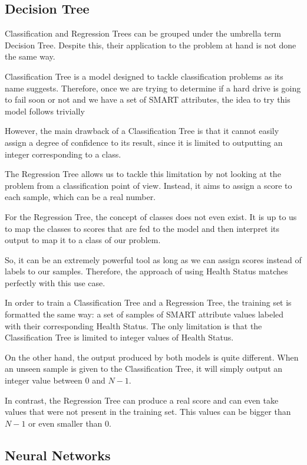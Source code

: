 \subsection{Decision Tree}\label{subsec:decision_tree}

Classification and Regression Trees can be grouped under the umbrella term Decision Tree.
Despite this, their application to the problem at hand is not done the same way.

Classification Tree is a model designed to tackle classification problems as its name suggests.
Therefore, once we are trying to determine if a hard drive is going to fail soon or not and we have a set of SMART attributes, the idea to try this model follows trivially

However, the main drawback of a Classification Tree is that it cannot easily assign a degree of confidence to its result, since it is limited to outputting an integer corresponding to a class.

The Regression Tree allows us to tackle this limitation by not looking at the problem from a classification point of view.
Instead, it aims to assign a score to each sample, which can be a real number.

For the Regression Tree, the concept of classes does not even exist.
It is up to us to map the classes to scores that are fed to the model and then interpret its output to map it to a class of our problem.

So, it can be an extremely powerful tool as long as we can assign scores instead of labels to our samples.
Therefore, the approach of using Health Status matches perfectly with this use case.

In order to train a Classification Tree and a Regression Tree, the training set is formatted the same way: a set of samples of SMART attribute values labeled with their corresponding Health Status.
The only limitation is that the Classification Tree is limited to integer values of Health Status.

On the other hand, the output produced by both models is quite different.
When an unseen sample is given to the Classification Tree, it will simply output an integer value between $0$ and $N-1$.

In contrast, the Regression Tree can produce a real score and can even take values that were not present in the training set.
This values can be bigger than $N-1$ or even smaller than $0$.

\subsection{Neural Networks}\label{subsec:nn}

